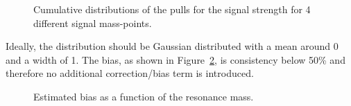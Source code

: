 \begin{figure}[h!]
\caption{Cumulative distributions of the pulls for the signal strength for 4 different signal mass-points.}
\label{fig:pullsMuCombo16}
\end{figure}
Ideally, the distribution should be Gaussian distributed with a mean around 0 and a width of 1. The bias, as shown in Figure~\ref{fig:bias}, is consistency below 50\% and therefore no additional correction/bias term is introduced.
\begin{figure}[h!]
\centering
{}
\caption{Estimated bias as a function of the resonance mass.}
\label{fig:bias}
\end{figure}
